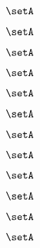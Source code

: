 \begin{forslides}
    \begin{equation}
        \label{eq:slides-translation-139}
        \setA
    \end{equation}
    
    \begin{equation}
        \label{eq:slides-translation-140}
        \setA
    \end{equation}

    \begin{equation}
        \label{eq:slides-translation-141}
        \setA
    \end{equation}

    \begin{equation}
        \label{eq:slides-translation-142}
        \setA
    \end{equation}

    \begin{equation}
        \label{eq:slides-translation-143}
        \setA
    \end{equation}

    \begin{equation}
        \label{eq:slides-translation-144}
        \setA
    \end{equation}

    \begin{equation}
        \label{eq:slides-translation-145}
        \setA
    \end{equation}

    \begin{equation}
        \label{eq:slides-translation-146}
        \setA
    \end{equation}

    \begin{equation}
        \label{eq:slides-translation-147}
        \setA
    \end{equation}

    \begin{equation}
        \label{eq:slides-translation-148}
        \setA
    \end{equation}

    \begin{equation}
        \label{eq:slides-translation-149}
        \setA
    \end{equation}
    
    \begin{equation}
        \label{eq:slides-translation-150}
        \setA
    \end{equation}


\end{forslides}
